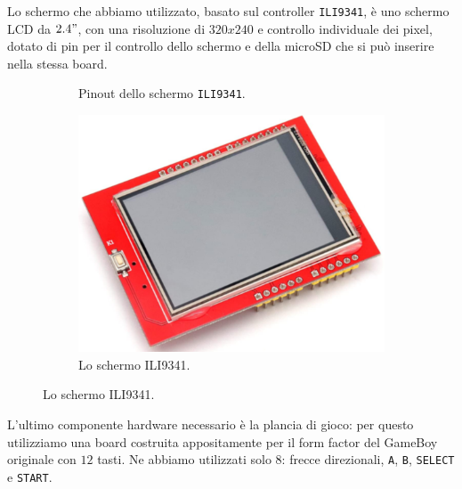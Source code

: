 \documentclass[hidelinks,12pt]{article}
\begin{document}
Lo schermo che abbiamo utilizzato, basato sul controller \texttt{ILI9341}, è
uno schermo LCD da $2.4"$, con una risoluzione di $320x240$ e controllo
individuale dei pixel, dotato di pin per il controllo dello schermo e della
microSD che si può inserire nella stessa board.
\begin{figure}[h]
	\begin{subfigure}[b]{0.45\textwidth}
		\begin{center}
			\begin{tikzpicture}[x=0.015cm, y=0.015cm, scale=0.5, transform shape]
				
			\end{tikzpicture}
		\end{center}
		\caption{Pinout dello schermo \texttt{ILI9341}.}
		\label{fig:pinout_ili}

	\end{subfigure}
	\hfill
	\begin{subfigure}[b]{0.45\textwidth}
		\begin{center}
			\includegraphics[scale=0.4]{figures/ili.png}
		\end{center}
		\caption{Lo schermo ILI9341.}
		\label{fig:ili9341}
	\end{subfigure}
\end{figure}

L'ultimo componente hardware necessario è la plancia di gioco: per questo
utilizziamo una board costruita appositamente per il form factor del GameBoy
originale con $12$ tasti. Ne abbiamo utilizzati solo $8$: frecce direzionali,
\texttt{A}, \texttt{B}, \texttt{SELECT} e \texttt{START}.
\end{document}
